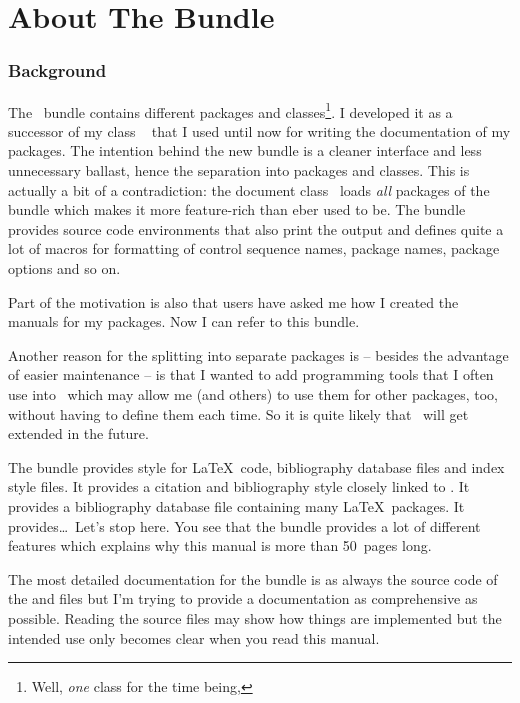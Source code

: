 \documentclass[load-preamble+,babel-options={ngerman,english}]{cnltx-doc}
\newcommand*\file[1]{\code{#1}}
\begin{document}
\part{About The Bundle}

\section{Background}

The \cnltx\ bundle contains different packages and classes\footnote{Well,
  \emph{one} class for the time being,}.  I developed it as a successor of my
class ~\cite{cls:cnpkgdoc} that I used until now for writing the
documentation of my packages.  The intention behind the new bundle is a
cleaner interface and less unnecessary ballast, hence the separation into
packages and classes.  This is actually a bit of a contradiction: the document
class \cnltxdoc\ loads \emph{all} packages of the bundle which makes it more
feature-rich than  eber used to be.  The bundle provides source
code environments that also print the output and defines quite a lot of macros
for formatting of control sequence names, package names, package options and
so on.

Part of the motivation is also that users have asked me how I created the
manuals for my packages.  Now I can refer to this bundle.

Another reason for the splitting into separate packages is -- besides the
advantage of easier maintenance -- is that I wanted to add programming tools
that I often use into \cnltxbase\ which may allow me (and others) to use them
for other packages, too, without having to define them each time.  So it is
quite likely that \cnltxbase\ will get extended in the future.

The bundle provides  style for \LaTeX\ code, bibliography
database files and index style files.  It provides a  citation
and bibliography style closely linked to \cnltxdoc.  It provides a
bibliography database file containing many \LaTeX\ packages.  It
provides\ldots\ Let's stop here.  You see that the bundle provides a lot of
different features which explains why this manual is more than 50~pages long.

The most detailed documentation for the bundle is as always the source code of
the \file{sty} and \file{cls} files but I'm trying to provide a documentation
as comprehensive as possible.  Reading the source files may show how things
are implemented but the intended use only becomes clear when you read this
manual.
\end{document}

